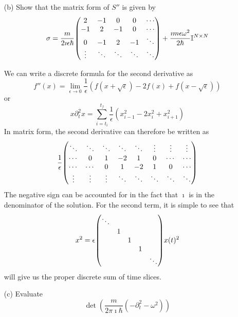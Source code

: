 \documentclass[a4paper,twoside]{article}
\begin{document}
\begin{itemize}
\begin{problem}
        \end{problem}
    \item[(b)] Show that the matrix form of $ S'' $ is given by
        \begin{equation}
            \sigma = \frac{m}{2 \imath \epsilon \hbar} \mqty(2 & -1 & 0 & 0 &\cdots\\-1 & 2 & -1 & 0 & \cdots\\0 & -1 & 2 & -1 & \ddots\\ \vdots & \ddots & \ddots & \ddots & \ddots) + \frac{\imath m \epsilon \omega^2}{2 \hbar} \mathbb{I}^{N \times N}
        \end{equation}
        \begin{problem}
            We can write a discrete formula for the second derivative as
            \begin{equation}
                f''(x) = \lim_{\epsilon \to 0} \frac{1}{\epsilon} \left( f(x + \sqrt{\epsilon}) - 2 f(x) + f(x- \sqrt{\epsilon}) \right)
            \end{equation}
            or
            \begin{equation}
                x \partial_t^2 x = \sum_{i=t_i}^{t_f} \frac{1}{\epsilon} \left( x_{i-1}^2 -2 x_{i}^2 + x_{i+1}^2 \right)
            \end{equation}
            In matrix form, the second derivative can therefore be written as
            \begin{equation}
                \frac{1}{\epsilon} \mqty(\ddots & \ddots & \ddots & \ddots & \ddots & \vdots & \vdots & \vdots\\ \cdots & 0 & 1 & -2 & 1 & 0 & \cdots & \cdots \\ \cdots & \cdots & 0 & 1 & -2 & 1 & 0 & \cdots \\ \vdots & \vdots & \vdots & \ddots & \ddots & \ddots & \ddots & \ddots)
            \end{equation}
            The negative sign can be accounted for in the fact that $ \imath $ is in the denominator of the solution. For the second term, it is simple to see that
            \begin{equation}
                x^2 = \epsilon \mqty(\dmat{\ddots,1,1,1,\ddots}) x(t)^2
            \end{equation}
            will give us the proper discrete sum of time slices.
        \end{problem}
    \item[(c)] Evaluate
        \begin{equation}
            \det\left( \frac{m}{2 \pi \imath \hbar} (- \partial^2_t - \omega^2) \right)

\end{equation}
\end{itemize}
\end{document}
